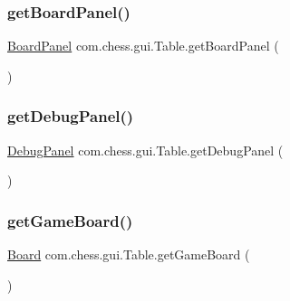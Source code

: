 \subsubsection{\texorpdfstring{getBoardPanel()}{getBoardPanel()}}
{\footnotesize\ttfamily \mbox{\hyperlink{classcom_1_1chess_1_1gui_1_1_table_1_1_board_panel}{Board\+Panel}} com.\+chess.\+gui.\+Table.\+get\+Board\+Panel (\begin{DoxyParamCaption}{ }\end{DoxyParamCaption})\hspace{0.3cm}{\ttfamily [private]}}

\mbox{\label{classcom_1_1chess_1_1gui_1_1_table_a1e5616c89c460dbe22bc0109067ee4a6}} 
\subsubsection{\texorpdfstring{getDebugPanel()}{getDebugPanel()}}
{\footnotesize\ttfamily \mbox{\hyperlink{classcom_1_1chess_1_1gui_1_1_debug_panel}{Debug\+Panel}} com.\+chess.\+gui.\+Table.\+get\+Debug\+Panel (\begin{DoxyParamCaption}{ }\end{DoxyParamCaption})\hspace{0.3cm}{\ttfamily [private]}}

\mbox{\label{classcom_1_1chess_1_1gui_1_1_table_a1bbfd084b475f295f96d2873ebbf8ffe}} 
\subsubsection{\texorpdfstring{getGameBoard()}{getGameBoard()}}
{\footnotesize\ttfamily \mbox{\hyperlink{classcom_1_1chess_1_1engine_1_1classic_1_1board_1_1_board}{Board}} com.\+chess.\+gui.\+Table.\+get\+Game\+Board (\begin{DoxyParamCaption}{ }\end{DoxyParamCaption})\hspace{0.3cm}{\ttfamily [private]}}

\mbox{\label{classcom_1_1chess_1_1gui_1_1_table_a6ad61ce575445fb93d142ab43cf8c976}} 
